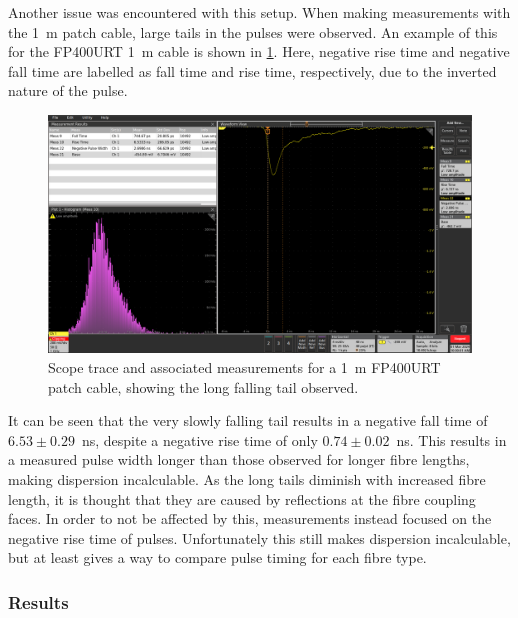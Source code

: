\documentclass[a4paper,11pt]{article}
\begin{document}
Another issue was encountered with this setup. When making measurements with the 1~m patch cable, large tails in the pulses were observed. An example of this for the FP400URT 1~m cable is shown in \cref{fig:fp400urt1m}. Here, negative rise time and negative fall time are labelled as fall time and rise time, respectively, due to the inverted nature of the pulse.
\begin{figure}[h]
\centering
\includegraphics[width=\textwidth]{FP400URT_1m_1.png}
\caption{Scope trace and associated measurements for a 1~m FP400URT patch cable, showing the long falling tail observed.}\label{fig:fp400urt1m}
\end{figure}
It can be seen that the very slowly falling tail results in a negative fall time of $6.53\pm0.29$~ns, despite a negative rise time of only $0.74\pm0.02$~ns. This results in a measured pulse width longer than those observed for longer fibre lengths, making dispersion incalculable. As the long tails diminish with increased fibre length, it is thought that they are caused by reflections at the fibre coupling faces. In order to not be affected by this, measurements instead focused on the negative rise time of pulses. Unfortunately this still makes dispersion incalculable, but at least gives a way to compare pulse timing for each fibre type.

\subsubsection{Results}\label{sec:fibre:sub:disp:sub:method}
\end{document}
